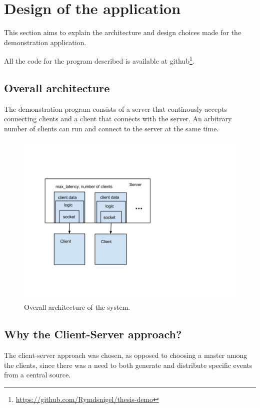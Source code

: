 \chapter{Design of the application}

This section aims to explain the architecture and design choices made for the demonstration application.

All the code for the program described is available at github\footnote{ \url{https://github.com/Rymdsnigel/thesis-demo}}.

\section{Overall architecture}
The demonstration program consists of a server that continously accepts connecting clients and a client that connects with the server. An arbitrary number of clients can run and connect to the server at the same time. 

\begin{figure}[h!]
\centering
\includegraphics[width=1.0\textwidth]{figures/arch.png}
\caption{Overall architecture of the system.}
\end{figure}


\section{Why the Client-Server approach?}
The client-server approach was chosen, as opposed to choosing a master among the clients, since there was a need to both generate and distribute specific events from a central source.

